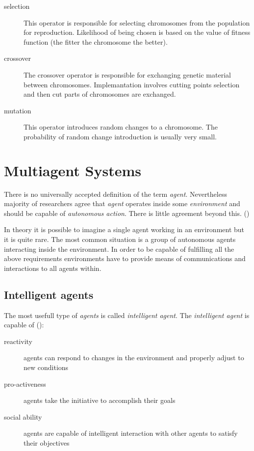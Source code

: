 \begin{description}

\item[selection]
  This operator is responsible for selecting chromosomes from the population for reproduction.
  Likelihood of being chosen is based on the value of fitness function (the fitter the chromosome the better).
  
\item[crossover]
  The crossover operator is responsible for exchanging genetic material between chromosomes.
  Implemantation involves cutting points selection and then cut parts of chromosomes are exchanged.

\item[mutation]
  This operator introduces random changes to a chromosome.
  The probability of random change introduction is usually very small.  

\end{description}


\section{Multiagent Systems}
\label{sec:multi}

There is no universally accepted definition of the term \emph{agent}.
Nevertheless majority of researchers agree that \emph{agent} operates inside some \emph{environment} and should be capable of \emph{autonomous action}.
There is little agreement beyond this. (\cite{Weiss}) 
 
In theory it is possible to imagine a single agent working in an environment but it is quite rare.
The most common situation is a group of autonomous agents interacting inside the environment.
In order to be capable of fulfilling all the above requirements environments have to provide means of communications and interactions to all agents within.

\subsection{Intelligent agents}

The most usefull type of \emph{agents} is called \emph{intelligent agent}.
The \emph{intelligent agent} is capable of (\cite{Weiss}):

\begin{description}
  \item [reactivity]
	  agents can respond to changes in the environment and properly adjust to new conditions
  \item [pro-activeness]
	  agents take the initiative to accomplish their goals
  \item [social ability]
	  agents are capable of intelligent interaction with other agents to satisfy their objectives
\end{description}

